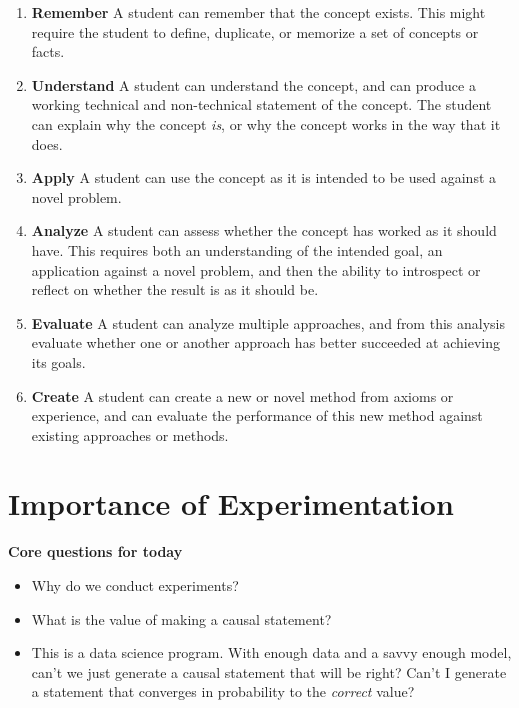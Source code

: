 \documentclass[
]{book}
\providecommand{\tightlist}{%
  \setlength{\itemsep}{0pt}\setlength{\parskip}{0pt}}
\begin{document}
\begin{enumerate}
\def\labelenumi{\arabic{enumi}.}
\tightlist
\item
  \textbf{Remember} A student can remember that the concept exists. This
  might require the student to define, duplicate, or memorize a set of
  concepts or facts.
\item
  \textbf{Understand} A student can understand the concept, and can
  produce a working technical and non-technical statement of the
  concept. The student can explain why the concept \emph{is}, or why the
  concept works in the way that it does.
\item
  \textbf{Apply} A student can use the concept as it is intended to be
  used against a novel problem.
\item
  \textbf{Analyze} A student can assess whether the concept has worked
  as it should have. This requires both an understanding of the intended
  goal, an application against a novel problem, and then the ability to
  introspect or reflect on whether the result is as it should be.
\item
  \textbf{Evaluate} A student can analyze multiple approaches, and from
  this analysis evaluate whether one or another approach has better
  succeeded at achieving its goals.
\item
  \textbf{Create} A student can create a new or novel method from axioms
  or experience, and can evaluate the performance of this new method
  against existing approaches or methods.
\end{enumerate}

\hypertarget{importance-of-experimentation}{%
\chapter{Importance of
Experimentation}\label{importance-of-experimentation}}

\textbf{Core questions for today}

\begin{itemize}
\tightlist
\item
  Why do we conduct experiments?
\item
  What is the value of making a causal statement?
\item
  This is a data science program. With enough data and a savvy enough
  model, can't we just generate a causal statement that will be right?
  Can't I generate a statement that converges in probability to the
  \emph{correct} value?
\end{itemize}
\end{document}
